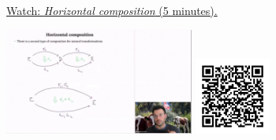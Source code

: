 
\begin{minipage}{10cm}
    \href{https://act4e-spring21.netlify.app/videos/spring2021-nat-trafos:natural-trafos:horizontal-composition.html}{Watch: \emph{Horizontal composition} (5 minutes).}
        
    \href{https://act4e-spring21.netlify.app/videos/spring2021-nat-trafos:natural-trafos:horizontal-composition.html}{\includegraphics[height=3.5cm]{spring2021-nat-trafos:natural-trafos:horizontal-composition/thumbnails.jpg}}
    \href{https://act4e-spring21.netlify.app/videos/spring2021-nat-trafos:natural-trafos:horizontal-composition.html}{\includegraphics[height=2.5cm]{spring2021-nat-trafos:natural-trafos:horizontal-composition/qrcode.png}}
\end{minipage}
